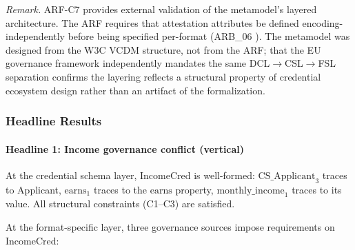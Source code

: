 \emph{Remark.} ARF-C7 provides external validation of the metamodel's layered architecture. The ARF requires that attestation attributes be defined encoding-independently before being specified per-format (ARB\_06 \citep{noauthor_eu-digital-identity-walleteudi-doc-architecture-and-reference-framework_2026}). The metamodel was designed from the W3C VCDM structure, not from the ARF; that the EU governance framework independently mandates the same DCL\(\to\)CSL\(\to\)FSL separation confirms the layering reflects a structural property of credential ecosystem design rather than an artifact of the formalization.

\subsubsection{Headline Results}\label{headline-results}

\label{sec:headlines}

\paragraph{Headline 1: Income governance conflict (vertical)}\label{headline-1-income-governance-conflict-vertical}

At the credential schema layer, IncomeCred is well-formed: \(\text{CS\_Applicant}_3\) traces to Applicant, \(\text{earns}_1\) traces to the \(\text{earns}\) property, \(\text{monthly\_income}_1\) traces to its value. All structural constraints (C1--C3) are satisfied.

At the format-specific layer, three governance sources impose requirements on IncomeCred:

